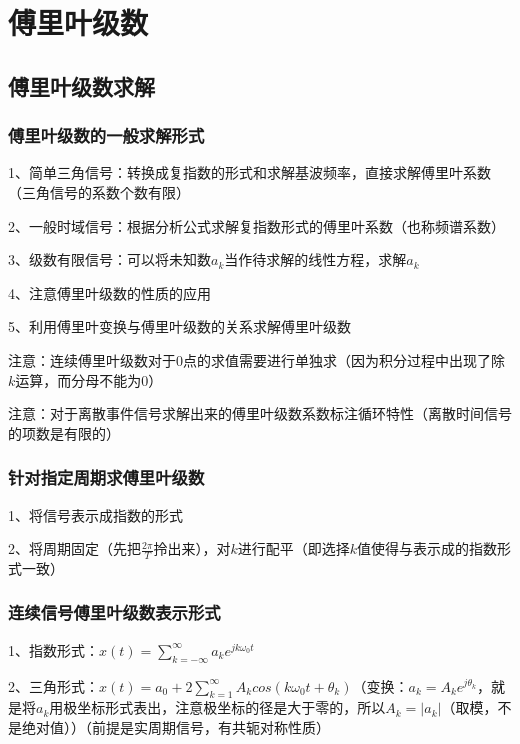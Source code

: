 \chapter{傅里叶级数}

\section{傅里叶级数求解}



\subsection{傅里叶级数的一般求解形式}

1、简单三角信号：转换成复指数的形式和求解基波频率，直接求解傅里叶系数（三角信号的系数个数有限）

2、一般时域信号：根据分析公式求解复指数形式的傅里叶系数（也称频谱系数）

3、级数有限信号：可以将未知数$a_k$当作待求解的线性方程，求解$a_k$

4、注意傅里叶级数的性质的应用

5、利用傅里叶变换与傅里叶级数的关系求解傅里叶级数

注意：连续傅里叶级数对于0点的求值需要进行单独求（因为积分过程中出现了除$k$运算，而分母不能为0）

注意：对于离散事件信号求解出来的傅里叶级数系数标注循环特性（离散时间信号的项数是有限的）



\subsection{针对指定周期求傅里叶级数}

1、将信号表示成指数的形式

2、将周期固定（先把$\frac{2\pi}{T}$拎出来），对$k$进行配平（即选择$k$值使得与表示成的指数形式一致）



\subsection{连续信号傅里叶级数表示形式}

1、指数形式：$x(t)=\sum_{k=-\infty}^{\infty}a_k e^{jk\omega_0t}$

2、三角形式：$x(t)=a_0 + 2\sum_{k=1}^{\infty}A_k cos(k\omega_0t+\theta_k)$（变换：$a_k=A_ke^{j\theta_k}$，就是将$a_k$用极坐标形式表出，注意极坐标的径是大于零的，所以$A_k=|a_k|$（取模，不是绝对值））（前提是实周期信号，有共轭对称性质）

